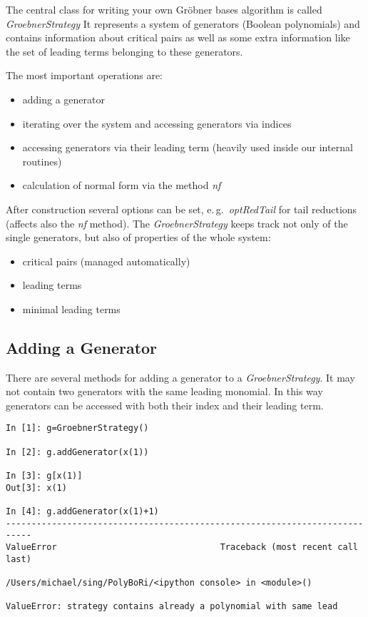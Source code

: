\documentclass[]{article}
\newcommand{\Groebner}{Gr\"{o}bner\xspace}
\newcommand{\functionname}[1]{\textit{#1}\xspace}
\newcounter{thm}
\begin{document}
The central class for writing your own \Groebner bases algorithm is called \functionname{GroebnerStrategy}
%
It represents a system of generators (Boolean polynomials) and contains information about critical pairs as well as some extra information like
the set of leading terms belonging to these generators.

The most important operations are:
\begin{itemize}
    \item adding a generator
    \item iterating over the system and accessing generators via indices
    \item accessing generators via their leading term (heavily used inside our internal routines)
    \item calculation of normal form via the method \functionname{nf} 
\end{itemize}

After construction several options can be set, e.\,g.\ \functionname{optRedTail} for tail reductions (affects also the \functionname{nf} method).
%
The \functionname{GroebnerStrategy} keeps track not only of the single generators, but also of properties of the whole system:
\begin{itemize}
    \item critical pairs (managed automatically)
    \item leading terms
    \item minimal leading terms
\end{itemize}
\subsection{Adding a Generator}
There are several methods for adding a generator to a \functionname{GroebnerStrategy}.
It may not contain two generators with the same leading monomial.
In this way generators can be accessed with both their index and their leading term.

\begin{verbatim}
In [1]: g=GroebnerStrategy()

In [2]: g.addGenerator(x(1))

In [3]: g[x(1)]
Out[3]: x(1)

In [4]: g.addGenerator(x(1)+1)
---------------------------------------------------------------------------
ValueError                                Traceback (most recent call last)

/Users/michael/sing/PolyBoRi/<ipython console> in <module>()

ValueError: strategy contains already a polynomial with same lead
\end{verbatim}
\end{document}
